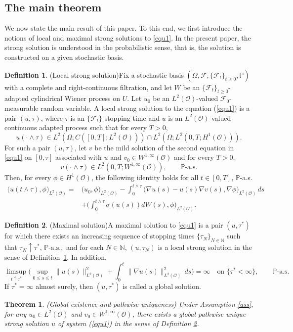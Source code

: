 \documentclass[reqno, 11pt]{amsart}
\newtheorem{thm}{Theorem}
\theoremstyle{definition}
\newtheorem{defn}{Definition}
\numberwithin{equation}{section} \numberwithin{lem}{section}
\numberwithin{thm}{section} \numberwithin{prop}{section}
\numberwithin{cor}{section} \numberwithin{rem}{section}
\numberwithin{defn}{section}
\begin{document}
\subsection{The main theorem }
We now state the main result of this paper. To this end, we first introduce the notions of local and maximal strong solutions to  \eqref{equ1}. In the present paper, the strong solution is understood in the probabilistic sense, that is, the solution is constructed on a given stochastic basis.


  \begin{defn}(Local strong solution)\label{def_local} Fix a stochastic basis
$(\Omega,\mathcal F,\{\mathcal F_t\}_{t\ge0},\mathbb P)$
with a complete and right-continuous filtration, and let $W$ be an $\{\mathcal F_t\}_{t\ge0}$-adapted cylindrical Wiener
process on $U$. Let $u_0$ be an $L^2(\mathcal{O})$-valued  $\mathcal{F}_0$-measurable random variable. A local strong solution to  the equation (\ref{equ1}) is a pair $(u,\tau)$, where $\tau$ is an $\{\mathcal F_t\}$-stopping time  and $u$ is an $L^2(\mathcal O)$-valued continuous adapted process such that for every $T>0$,
	\[
	u(\cdot\wedge\tau)\in L^2(\Omega;C([0,T];L^2(\mathcal O)))
	\cap L^2(\Omega; L^2(0,T;H^1(\mathcal O))).
	\]
    For such a pair $(u,\tau)$, let $v$ be the mild solution of the second
equation in \eqref{equ1} on $[0,\tau]$ associated with $u$ and
$v_0\in W^{1,\infty}(\mathcal O)$ and  for every $T>0$,
\[
v(\cdot\wedge\tau)
\in L^2(0,T;W^{1,\infty}(\mathcal O)),
\qquad \mathbb P\text{-a.s.}
\]
  	Then, for every $\phi\in H^1(\mathcal O)$, the following identity holds
for all $t\in[0,T]$, $\mathbb P$-a.s.
  \begin{align*}
      \big(u(t\wedge{\tau}),\phi \big)_{L^2(\mathcal{O})}=&\big(u_0,\phi \big)_{L^2(\mathcal{O})}-\int_0^{t\wedge{\tau}}\big(\nabla u(s)-u(s)\nabla v(s),\nabla\phi\big)_{L^2(\mathcal{O})} \,ds\\&+\Big(\int_0^{t\wedge{\tau}}\sigma(u(s))dW(s),\phi\Big)_{L^2(\mathcal{O})}.
  \end{align*}

  
 \end{defn}
   \begin{defn}(Maximal solution)\label{def_max}
A maximal solution to \eqref{equ1} is a pair $(u,\tau^*)$ for which there exists an increasing sequence of stopping times $\{\tau_N\}_{N\in\mathbb N}$ such that $\tau_N\uparrow \tau^*
,\,\mathbb P\text{-a.s.},$
and for each $N\in\mathbb N$, $(u,\tau_N)$ is a local strong solution in the sense of Definition~\ref{def_local}. In addition,
	\[
	\limsup_{t\uparrow\tau^*}
	\Big(
	\sup_{0\le s\le t}
	\|u(s)\|_{L^2(\mathcal O)}^2
	+
	\int_0^t
	\|\nabla u(s)\|_{L^2(\mathcal O)}^2\,ds
	\Big)
	=\infty
	\quad\text{on }\{\tau^*<\infty\},
	\qquad\mathbb P\text{-a.s.}
	\]
If $\tau^*=\infty$ almost surely, then $(u,\tau^*)$ is called a global solution.
\end{defn}
 \begin{thm}\label{thm1}(Global existence and pathwise uniqueness) 
     Under Assumption \ref{ass},  for any $u_0\in L^2(\mathcal {O})$ and  $v_0\in W^{1,\infty}(\mathcal {O}) $,  there exists a global pathwise unique strong solution $u$ of system (\ref{equ1}) in the sense  of Definition \ref{def_max}. 
\end{thm}  
\end{document}
